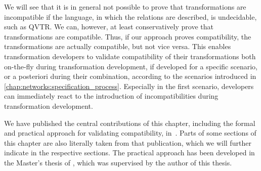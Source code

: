 
We will see that it is in general not possible to prove that transformations are incompatible if the language, in which the relations are described, is undecidable, such as \gls{QVTR}.
We can, however, at least conservatively prove that transformations are compatible.
Thus, if our approach proves compatibility, the transformations are actually compatible, but not vice versa.
This enables transformation developers to validate compatibility of their transformations both on-the-fly during transformation development, if developed for a specific scenario, or a posteriori during their combination, according to the scenarios introduced in \autoref{chap:networks:specification_process}.
Especially in the first scenario, developers can immediately react to the introduction of incompatibilities during transformation development.

We have published the central contributions of this chapter, including the formal and practical approach for validating compatibility, in~.
Parts of some sections of this chapter are also literally taken from that publication, which we will further indicate in the respective sections.
The practical approach has been developed in the Master's thesis of \textcite{pepin2019ma}, which was supervised by the author of this thesis.





